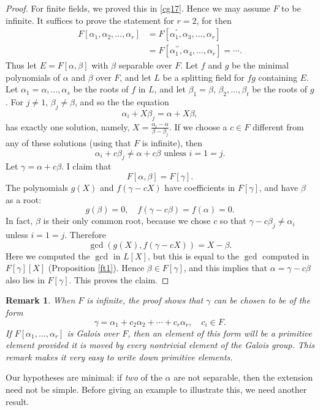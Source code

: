 \documentclass[a4paper,11pt,final,openany]{memoir}
\newtheorem{remark}[X]{Remark}
\theoremstyle{nonumberplain}
\newtheorem{proof}{Proof.}
\begin{document}
\begin{proof}
For finite fields, we proved this in \ref{cg17}. Hence we may assume $F$ to be
infinite. It suffices to prove the statement for $r=2$, for then%
\begin{align*}
F[\alpha_{1},\alpha_{2},\ldots,\alpha_{r}]&=F[\alpha_{1}^{\prime},\alpha
  _{3},\ldots,\alpha_{r}]\\
&=F[\alpha_{1}^{\prime\prime},\alpha_{4},\ldots
,\alpha_{r}]=\cdots.
\end{align*}
Thus let $E=F[\alpha,\beta]$ with $\beta$ separable over $F$. Let $f$ and $g$
be the minimal polynomials of $\alpha$ and $\beta$ over $F$, and let $L$ be a
splitting field for $fg$ containing $E$. Let $\alpha_{1}=\alpha,\ldots
,\alpha_{s}$ be the roots of $f$ in $L$, and let $\beta_{1}=\beta$, $\beta
_{2},\ldots,\beta_{t}$ be the roots of $g$. For $j\neq1$, $\beta_{j}\neq\beta
$, and so the the equation
\[
\alpha_{i}+X\beta_{j}=\alpha+X\beta,
\]
has exactly one solution, namely, $X=\frac{\alpha_{i}-\alpha}{\beta-\beta_{j}%
}$. If we choose a $c\in F$ different from any of these solutions (using that
$F$ is infinite), then
\[
\alpha_{i}+c\beta_{j}\neq\alpha+c\beta\text{\ unless }i=1=j.
\]
Let $\gamma=\alpha+c\beta$. I claim that%
\[
F[\alpha,\beta]=F[\gamma]\text{.}%
\]
The polynomials $g(X)$ and $f(\gamma-cX)$ have coefficients in $F[\gamma]$,
and have $\beta$ as a root:
\[
g(\beta)=0,\quad f(\gamma-c\beta)=f(\alpha)=0.
\]
In fact, $\beta$ is their only common root, because we chose $c$ so that
$\gamma-c\beta_{j}\neq\alpha_{i}$ unless $i=1=j$. Therefore
\[
\gcd(g(X),f(\gamma-cX))=X-\beta\text{.}%
\]
Here we computed the $\gcd$ in $L[X]$, but this is equal to the $\gcd$
computed in $F[\gamma][X]$ (Proposition \ref{ft1}). Hence $\beta\in F[\gamma
]$, and this implies that $\alpha=\gamma-c\beta$ also lies in $F[\gamma]$.
This proves the claim.
\end{proof}

\begin{remark}
\label{ag2}When $F$ is infinite, the proof shows that $\gamma$ can be chosen
to be of the form
\[
\gamma=\alpha_{1}+c_{2}\alpha_{2}+\cdots+c_{r}\alpha_{r},\quad c_{i}\in F.
\]
If $F[\alpha_{1},\ldots,\alpha_{r}]$ is Galois over $F$, then an element of
this form will be a primitive element provided it is moved by every nontrivial
element of the Galois group. This remark makes it very easy to write down
primitive elements.
\end{remark}

Our hypotheses are minimal: if \textit{two\/ }of the $\alpha$ are not
separable, then the extension need not be simple. Before giving an example to
illustrate this, we need another result.
\end{document}
